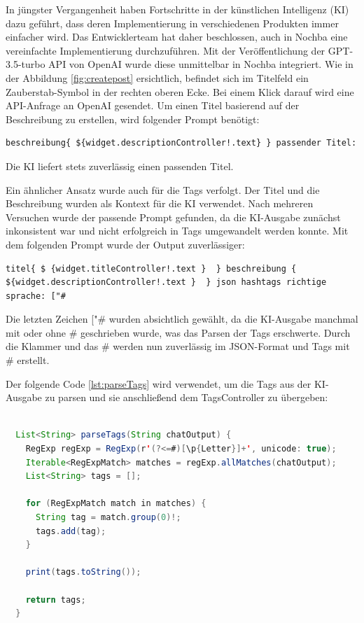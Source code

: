 In jüngster Vergangenheit haben Fortschritte in der künstlichen Intelligenz (KI) dazu geführt, dass deren Implementierung in verschiedenen Produkten immer einfacher wird. Das Entwicklerteam hat daher beschlossen, auch in Nochba eine vereinfachte Implementierung durchzuführen. Mit der Veröffentlichung der GPT-3.5-turbo API von OpenAI wurde diese unmittelbar in Nochba integriert. Wie in der Abbildung \ref{fig:createpost} ersichtlich, befindet sich im Titelfeld ein Zauberstab-Symbol in der rechten oberen Ecke. Bei einem Klick darauf wird eine API-Anfrage an OpenAI gesendet. Um einen Titel basierend auf der Beschreibung zu erstellen, wird folgender Prompt benötigt:
\begin{verbatim}
beschreibung{ ${widget.descriptionController!.text} } passender Titel:
\end{verbatim}

Die KI liefert stets zuverlässig einen passenden Titel.

Ein ähnlicher Ansatz wurde auch für die Tags verfolgt. Der Titel und die Beschreibung wurden als Kontext für die KI verwendet. Nach mehreren Versuchen wurde der passende Prompt gefunden, da die KI-Ausgabe zunächst inkonsistent war und nicht erfolgreich in Tags umgewandelt werden konnte. Mit dem folgenden Prompt wurde der Output zuverlässiger:

\begin{verbatim}
titel{ $ {widget.titleController!.text }  } beschreibung { ${widget.descriptionController!.text }  } json hashtags richtige sprache: ["#
\end{verbatim}


Die letzten Zeichen ["\# wurden absichtlich gewählt, da die
KI-Ausgabe manchmal mit oder ohne \# geschrieben wurde, was
das Parsen der Tags erschwerte. Durch die Klammer und das \#
werden nun zuverlässig im JSON-Format und Tags mit \#
erstellt.

Der folgende Code \ref{lst:parseTags} wird verwendet, um die Tags aus der KI-Ausgabe zu parsen und sie anschließend dem TagsController zu übergeben:

\begin{lstlisting}[language=Java,caption=parseTags von 
  KI output,label=lst:parseTags]  
  
  List<String> parseTags(String chatOutput) {
    RegExp regExp = RegExp(r'(?<=#)[\p{Letter}]+', unicode: true);
    Iterable<RegExpMatch> matches = regExp.allMatches(chatOutput);
    List<String> tags = [];

    for (RegExpMatch match in matches) {
      String tag = match.group(0)!;
      tags.add(tag);
    }

    print(tags.toString());

    return tags;
  }
    
\end{lstlisting}


